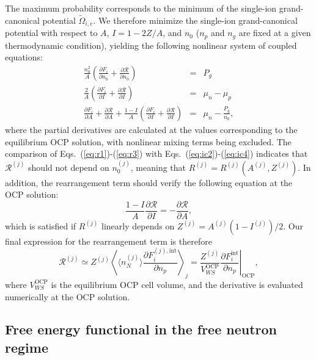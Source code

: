 The maximum probability corresponds to the minimum of the single-ion
grand-canonical potential $\tilde{\Omega}_{i,e}$. We therefore minimize the 
single-ion grand-canonical potential with respect to $A$, $I=1-2Z/A$, and 
$n_0$ ($n_p$ and $n_g$ are fixed at a given thermodynamic condition), yielding 
the following nonlinear system of coupled equations:
%
\begin{eqnarray}
  \frac{n_0^2}{A}\left(\frac{\partial F_i}{\partial n_0} + \frac{\partial
  \mathcal{R}}{\partial n_0}\right) &=& P_g\label{eq:r1}\\
  \frac{2}{A}\left(\frac{\partial F_i}{\partial I} + \frac{\partial
  \mathcal{R}}{\partial I}\right) &=& \mu_n - \mu_p\label{eq:r2}\\
  \frac{\partial F_i}{\partial A} + \frac{\partial \mathcal{R}}{\partial A} +
  \frac{1-I}{A}\left(\frac{\partial F_i}{\partial I} + \frac{\partial
  \mathcal{R}}{\partial I}\right) &=& \mu_n - \frac{P_g}{n_0},\label{eq:r3}
\end{eqnarray}
%
where the partial derivatives are calculated at the values corresponding to 
the equilibrium OCP solution, with nonlinear mixing terms being excluded.
%
The comparison of Eqs.~(\ref{eq:r1})-(\ref{eq:r3}) with
Eqs.~(\ref{eq:ic2})-(\ref{eq:ic4}) indicates that $\mathcal{R}^{(j)}$ should 
not depend on $n_0^{(j)}$, meaning that $R^{(j)}=R^{(j)}(A^{(j)},Z^{(j)})$. In 
addition, the rearrangement term should verify the following equation at the 
OCP solution:
%
\begin{equation}
  \frac{1-I}{A}\frac{\partial \mathcal{R}}{\partial I} = -\frac{\partial
  \mathcal{R}}{\partial A},
\end{equation}
%
which is satisfied if $R^{(j)}$ linearly depends on 
$Z^{(j)} = A^{(j)} (1-I^{(j)})/2$. Our final expression for the rearrangement 
term is therefore
%
\begin{equation}
  \mathcal{R}^{(j)} \simeq Z^{(j)} \left\langle \langle n_N^{(j)}\rangle 
    \frac{\partial F_i^{(j),\text{int}}}{\partial n_p}\right\rangle_j
  = \frac{Z^{(j)}}{V_{WS}^{\text{OCP}}}
  \left.\frac{\partial F_i^{\text{int}}}{\partial n_p}\right|_{\text{OCP}},
\end{equation}
%
where $V_{WS}^{\text{OCP}}$ is the equilibrium OCP cell volume, and the
derivative is evaluated numerically at the OCP solution.

\subsection{Free energy functional in the free neutron 
regime}\label{subsec:freeenfunctional}


